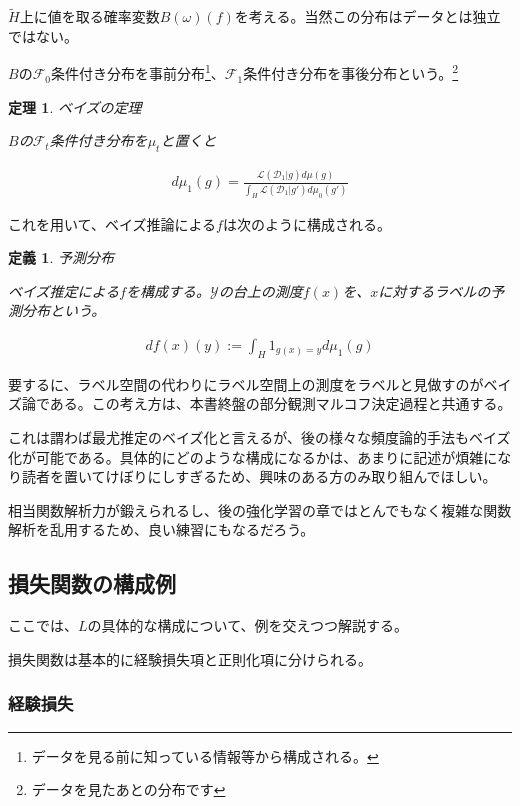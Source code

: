 \documentclass{jsarticle}
\newtheorem{theo}{定理}[section]
\newtheorem{defi}{定義}[section]
\begin{document}
$\tilde{H}$上に値を取る確率変数$B(\omega)(f)$を考える。当然この分布はデータとは独立ではない。

$B$の$\mathcal{F}_0$条件付き分布を事前分布\footnote{データを見る前に知っている情報等から構成される。}、$\mathcal{F}_1$条件付き分布を事後分布という。\footnote{データを見たあとの分布です}

\begin{theo} ベイズの定理

$B$の$\mathcal{F}_t$条件付き分布を$\mu_t$と置くと

\begin{align}
d\mu_1(g) =\frac{\mathcal{L}(\mathcal{D}_1|g)d\mu(g)}{\int_H \mathcal{L}(\mathcal{D}_1|g')d\mu_0(g')}
\end{align}

\end{theo}

これを用いて、ベイズ推論による$f$は次のように構成される。

\begin{defi} 予測分布

ベイズ推定による$f$を構成する。$\mathcal{Y}$の台上の測度$f(x)$を、$x$に対するラベルの予測分布という。

\begin{align}
df(x)(y):=\int_H 1_{g(x)=y}  d\mu_1(g)
\end{align}

\end{defi}

要するに、ラベル空間の代わりにラベル空間上の測度をラベルと見做すのがベイズ論である。この考え方は、本書終盤の部分観測マルコフ決定過程と共通する。

これは謂わば最尤推定のベイズ化と言えるが、後の様々な頻度論的手法もベイズ化が可能である。具体的にどのような構成になるかは、あまりに記述が煩雑になり読者を置いてけぼりにしすぎるため、興味のある方のみ取り組んでほしい。

相当関数解析力が鍛えられるし、後の強化学習の章ではとんでもなく複雑な関数解析を乱用するため、良い練習にもなるだろう。


\subsection{損失関数の構成例}

ここでは、$L$の具体的な構成について、例を交えつつ解説する。

損失関数は基本的に経験損失項と正則化項に分けられる。


\subsubsection{経験損失}
\end{document}
